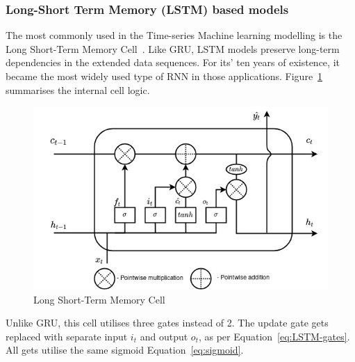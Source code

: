 %
\subsubsection{Long-Short Term Memory (LSTM) based models} \label{subsub:lstm}
The most commonly used in the Time-series Machine learning modelling is the Long Short-Term Memory Cell~\cite{LSTM_Hochreiter1997}.
Like GRU, LSTM models preserve long-term dependencies in the extended data sequences.
For its' ten years of existence, it became the most widely used type of RNN in those applications.
\mbox{Figure~\ref{fig:LSTM-cell}} summarises the internal cell logic.
\begin{figure}[ht]%
    \centering
    \includegraphics[width=\linewidth]{II_Body/LSTM/images/LSTM.jpg}
    \caption{Long Short-Term Memory Cell}
    \label{fig:LSTM-cell}
\end{figure}
Unlike GRU, this cell utilises three gates instead of 2.
The update gate gets replaced with separate input $i_t$ and output $o_t$, as per \mbox{Equation~\ref{eq:LSTM-gates}}.
All gets utilise the same sigmoid \mbox{Equation~\ref{eq:sigmoid}}.

